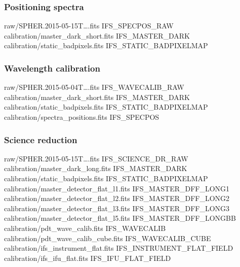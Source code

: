 \documentclass[twoside,single]{lion-msc}
\begin{document}
\subsubsection*{Positioning spectra}
\begin{mdframed}[linewidth = 0.3mm, linecolor = black]
raw/SPHER.2015-05-15T\dots.fits IFS\_SPECPOS\_RAW\\
calibration/master\_dark\_short.fits IFS\_MASTER\_DARK\\
calibration/static\_badpixels.fits IFS\_STATIC\_BADPIXELMAP
\end{mdframed}

\subsubsection*{Wavelength calibration}
\begin{mdframed}[linewidth = 0.3mm, linecolor = black]
raw/SPHER.2015-05-04T\dots.fits IFS\_WAVECALIB\_RAW\\
calibration/master\_dark\_short.fits IFS\_MASTER\_DARK\\
calibration/static\_badpixels.fits IFS\_STATIC\_BADPIXELMAP\\
calibration/spectra\_positions.fits IFS\_SPECPOS
\end{mdframed}

\subsubsection*{Science reduction}
\begin{mdframed}[linewidth = 0.3mm, linecolor = black]
raw/SPHER.2015-05-15T\dots.fits IFS\_SCIENCE\_DR\_RAW\\
calibration/master\_dark\_long.fits IFS\_MASTER\_DARK\\
calibration/static\_badpixels.fits IFS\_STATIC\_BADPIXELMAP\\
calibration/master\_detector\_flat\_l1.fits IFS\_MASTER\_DFF\_LONG1\\
calibration/master\_detector\_flat\_l2.fits IFS\_MASTER\_DFF\_LONG2\\
calibration/master\_detector\_flat\_l3.fits IFS\_MASTER\_DFF\_LONG3\\
calibration/master\_detector\_flat\_l5.fits IFS\_MASTER\_DFF\_LONGBB\\
calibration/pdt\_wave\_calib.fits IFS\_WAVECALIB\\
calibration/pdt\_wave\_calib\_cube.fits IFS\_WAVECALIB\_CUBE\\
calibration/ifs\_instrument\_flat.fits IFS\_INSTRUMENT\_FLAT\_FIELD\\
calibration/ifs\_ifu\_flat.fits IFS\_IFU\_FLAT\_FIELD
\end{mdframed}
\end{document}
